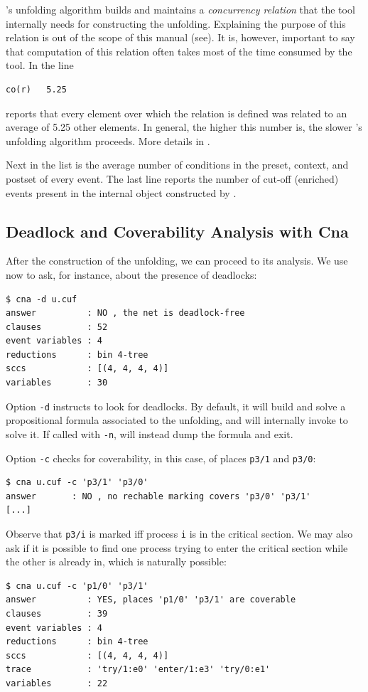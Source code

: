 \documentclass[a4paper]{refart}
\begin{document}
\cunf's unfolding algorithm builds and maintains a \emph{concurrency relation}
that the tool internally needs for constructing the unfolding.
Explaining the purpose of this relation is out
of the scope of this manual (see\cite{BBCKRS12}).
It is, however, important to say that computation of this relation often takes
most of the time consumed by the tool.  In the line
\begin{verbatim}
co(r)   5.25
\end{verbatim}
\cunf reports that every element over which the relation is
defined was related to an average of 5.25 other elements.
In general, the higher this number is, the slower \cunf's unfolding
algorithm proceeds.
More details in \cite[section 7]{BBCKRS12}.

Next in the list is the average number of conditions in the 
preset, context, and postset of every event.  The last line reports
the number of cut-off (enriched) events present in the internal object
constructed by \cunf.

\subsection{Deadlock and Coverability Analysis with Cna}%
\label{s:deadlock}

After the construction of the unfolding, we can proceed to its analysis.
We use now \cna{} to ask, for instance, about the presence of deadlocks:
\begin{verbatim}
$ cna -d u.cuf
answer          : NO , the net is deadlock-free
clauses         : 52
event variables : 4
reductions      : bin 4-tree
sccs            : [(4, 4, 4, 4)]
variables       : 30
\end{verbatim}
Option \verb!-d! instructs \cna{} to look for deadlocks.
By default, it will build and solve a propositional formula associated to the
unfolding, and will internally invoke \minisat to solve it.
If called with \verb!-n!, \cna will instead dump the formula and exit.

Option \verb!-c! checks for coverability, in this case, of places
\verb!p3/1! and \verb!p3/0!:
\begin{verbatim}
$ cna u.cuf -c 'p3/1' 'p3/0'
answer       : NO , no rechable marking covers 'p3/0' 'p3/1'
[...]
\end{verbatim}
Observe that \verb!p3/i! is marked iff process \verb!i! is in the critical
section.
We may also ask if it is possible to find one process trying to enter the
critical section while the other is already in, which is naturally possible:
\begin{verbatim}
$ cna u.cuf -c 'p1/0' 'p3/1'
answer          : YES, places 'p1/0' 'p3/1' are coverable
clauses         : 39
event variables : 4
reductions      : bin 4-tree
sccs            : [(4, 4, 4, 4)]
trace           : 'try/1:e0' 'enter/1:e3' 'try/0:e1'
variables       : 22
\end{verbatim}
\end{document}
